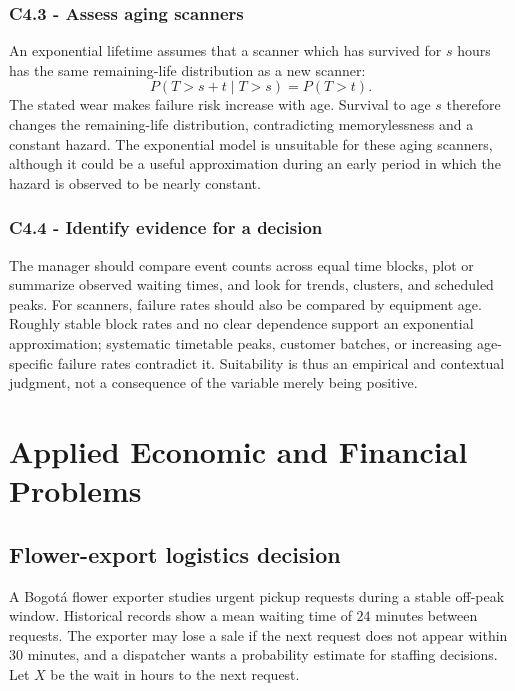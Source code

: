 \subsubsection*{C4.3 - Assess aging scanners}\label{subsec:c4-suitability-operations-c}
An exponential lifetime assumes that a scanner which has survived for $s$
hours has the same remaining-life distribution as a new scanner:
\[
 P(T>s+t\mid T>s)=P(T>t).
\]
The stated wear makes failure risk increase with age.  Survival to age $s$
therefore changes the remaining-life distribution, contradicting
memorylessness and a constant hazard.  The exponential model is unsuitable
for these aging scanners, although it could be a useful approximation during
an early period in which the hazard is observed to be nearly constant.

\subsubsection*{C4.4 - Identify evidence for a decision}\label{subsec:c4-suitability-operations-d}
The manager should compare event counts across equal time blocks, plot or
summarize observed waiting times, and look for trends, clusters, and scheduled
peaks.  For scanners, failure rates should also be compared by equipment age.
Roughly stable block rates and no clear dependence support an exponential
approximation; systematic timetable peaks, customer batches, or increasing
age-specific failure rates contradict it.  Suitability is thus an empirical
and contextual judgment, not a consequence of the variable merely being
positive.

\section{Applied Economic and Financial Problems}\label{sec:c4-applied}

\subsection{Flower-export logistics decision}\label{sec:c4-applied-logistics}
A Bogotá flower exporter studies urgent pickup requests during a stable
off-peak window.  Historical records show a mean waiting time of $24$ minutes
between requests.  The exporter may lose a sale if the next request does not
appear within 30 minutes, and a dispatcher wants a probability estimate for
staffing decisions.  Let $X$ be the wait in hours to the next request.

